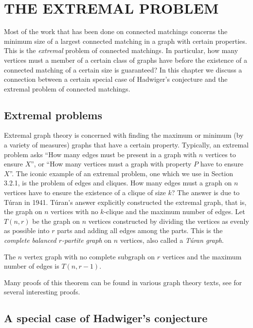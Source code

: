 \chapter{THE EXTREMAL PROBLEM}


	Most of the work that has been done on connected matchings concerns the minimum size of a largest connected matching in a graph with certain properties.  This is the {\it extremal} problem of connected matchings.  In particular, how many vertices must a member of a certain class of graphs have before the existence of a connected matching of a certain size is guaranteed?  In this chapter we discuss a connection between a certain special case of Hadwiger's conjecture and the extremal problem of connected matchings.

\section{Extremal problems}

	 Extremal graph theory is concerned with finding the maximum or minimum (by a variety of measures) graphs that have a certain property.  Typically, an extremal problem asks ``How many edges must be present in a graph with $n$ vertices to ensure $X$'', or ``How many vertices must a graph with property $P$ have to ensure $X$''.  The iconic example of an extremal problem, one which we use in Section 3.2.1, is the problem of edges and cliques.  How many edges must a graph on $n$ vertices have to ensure the existence of a clique of size $k$?
The answer is due to T\'uran in 1941.  T\'uran's answer \cite{turan} explicitly constructed the extremal graph, that is, the graph on $n$ vertices with no $k$-clique and the maximum number of edges.  Let $T(n,r)$ be the graph on $n$ vertices constructed by dividing the vertices as evenly as possible into $r$ parts and adding all edges among the parts.  This is the {\it complete balanced $r$-partite graph} on $n$ vertices, also called a {\it T\'uran graph}.
\begin{theorem}
	The $n$ vertex graph with no complete subgraph on $r$ vertices and the maximum number of edges is $T(n, r-1)$.
\end{theorem}
Many proofs of this theorem can be found in various graph theory texts, see \cite{PFTB} for several interesting proofs.

\section{A special case of Hadwiger's conjecture}

